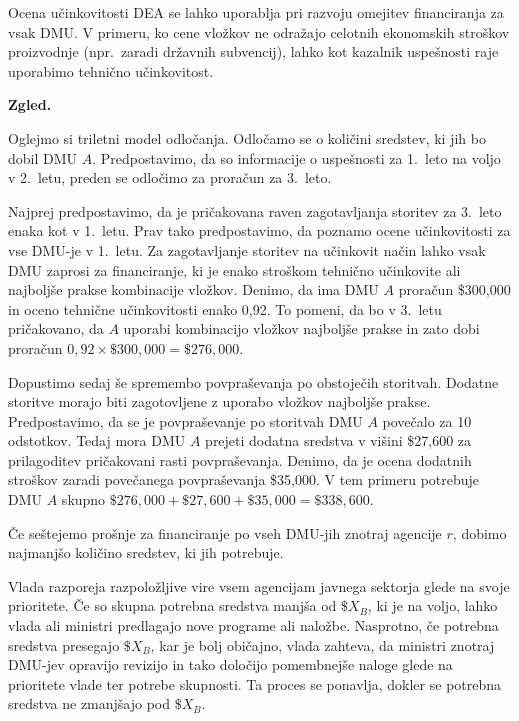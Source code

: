 \documentclass[12pt,a4paper]{article}
\theoremstyle{definition}
\newenvironment{zgled}{%
  \begin{mdframed}[linewidth=0.5pt, topline=true, bottomline=true, leftline=true, rightline=true, 
                  innertopmargin=\baselineskip, innerbottommargin=\baselineskip]%
  \textbf{Zgled.}%
}{%
  \end{mdframed}%
}
\begin{document}
Ocena učinkovitosti DEA se lahko uporablja pri razvoju
omejitev financiranja za vsak DMU. V primeru, ko cene
vložkov ne odražajo celotnih ekonomskih stroškov proizvodnje
(npr.\ zaradi državnih subvencij), lahko kot kazalnik 
uspešnosti raje uporabimo tehnično učinkovitost. 
\cite{Yaisawarng2002}

\begin{zgled}
    Oglejmo si triletni model odločanja. Odločamo se o količini sredstev, ki jih bo dobil DMU $A$. Predpostavimo, da so informacije o uspešnosti za 1.\ leto na voljo v 2.\ letu, preden se odločimo za proračun za 3.\ leto.

    Najprej predpostavimo, da je pričakovana raven
    zagotavljanja storitev za 3.\ leto enaka kot v 1.\
    letu. Prav tako predpostavimo, da poznamo ocene
    učinkovitosti za vse DMU-je v 1.\ letu. Za
    zagotavljanje storitev na učinkovit način lahko vsak
    DMU zaprosi za financiranje, ki je enako stroškom tehnično
    učinkovite ali najboljše prakse kombinacije vložkov.
    Denimo, da ima DMU $A$ proračun \$300{,}000 in oceno
    tehnične učinkovitosti enako 0{,}92. To pomeni, da bo v
    3.\ letu pričakovano, da $A$ uporabi kombinacijo vložkov
    najboljše prakse in zato dobi proračun $0{,}92 \times \$300{,}000 =
    \$276{,}000$.

    Dopustimo sedaj še spremembo povpraševanja po obstoječih
    storitvah. Dodatne storitve morajo biti zagotovljene
    z uporabo vložkov najboljše prakse. Predpostavimo,
    da se je povpraševanje po storitvah DMU $A$ povečalo
    za 10 odstotkov. Tedaj mora DMU $A$ prejeti dodatna
    sredstva v višini \$27{,}600 za prilagoditev 
    pričakovani rasti povpraševanja. Denimo, da je
    ocena dodatnih stroškov zaradi povečanega
    povpraševanja \$35{,}000. V tem primeru potrebuje
    DMU $A$ skupno $\$276{,}000 + \$27{,}600 + \$35{,}000
    = \$338{,}600$.
    
    Če seštejemo prošnje za financiranje po vseh DMU-jih
    znotraj agencije $r$, dobimo najmanjšo količino sredstev,
    ki jih potrebuje. \cite{Yaisawarng2002}
\end{zgled}

Vlada razporeja razpoložljive vire vsem agencijam 
javnega sektorja glede na svoje prioritete. Če so
skupna potrebna sredstva manjša od $\$X_B$, ki je na
voljo, lahko vlada ali ministri predlagajo nove 
programe ali naložbe. Nasprotno, če potrebna sredstva
presegajo $\$X_B$, kar je bolj običajno, vlada
zahteva, da ministri znotraj DMU-jev opravijo revizijo
in tako določijo pomembnejše naloge glede na prioritete
vlade ter potrebe skupnosti. Ta proces se ponavlja,
dokler se potrebna sredstva ne zmanjšajo pod $\$X_B$.
\end{document}
